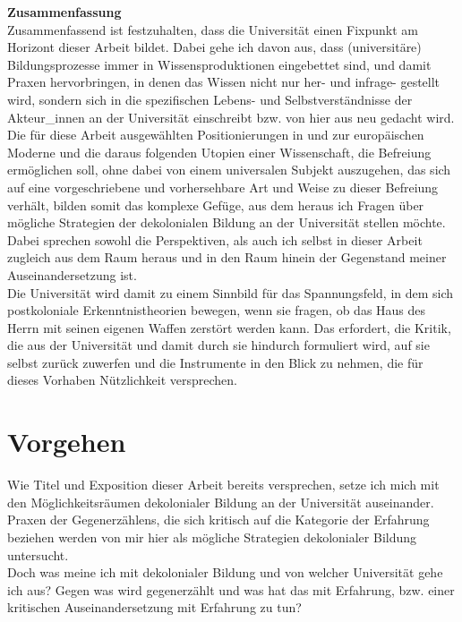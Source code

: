 \noindent\textbf{\large Zusammenfassung}\\
Zusammenfassend ist festzuhalten, dass die
Universität einen Fixpunkt am Horizont dieser Arbeit bildet. Dabei gehe ich
davon aus, dass (universitäre) Bildungsprozesse immer in Wissensproduktionen
eingebettet sind, und damit Praxen hervorbringen, in denen das Wissen nicht nur
her- und infrage- gestellt wird, sondern sich in die spezifischen Lebens- und
Selbstverständnisse der Akteur\_innen an der Universität einschreibt bzw. von
hier aus neu gedacht wird.\\
Die für diese Arbeit ausgewählten Positionierungen in und zur europäischen
Moderne und die daraus folgenden Utopien einer Wissenschaft, die Befreiung
ermöglichen soll, ohne dabei von einem universalen Subjekt auszugehen, das sich
auf eine vorgeschriebene und vorhersehbare Art und Weise zu dieser Befreiung
verhält, bilden somit das komplexe Gefüge, aus dem heraus ich Fragen über
mögliche Strategien der dekolonialen Bildung an der Universität stellen möchte.\\
Dabei sprechen sowohl die Perspektiven, als auch ich selbst in dieser Arbeit
zugleich aus dem Raum heraus und in den Raum hinein der Gegenstand meiner
Auseinandersetzung ist. \\
Die Universität wird damit zu einem Sinnbild für das
Spannungsfeld, in dem sich postkoloniale Erkenntnistheorien bewegen, wenn sie
fragen, ob das Haus des Herrn mit seinen eigenen Waffen zerstört werden
kann.\footnotemark {} Das erfordert, die Kritik, die aus der Universität und damit durch sie hindurch formuliert wird, auf sie selbst zurück zuwerfen und die Instrumente in den Blick zu nehmen, die für dieses Vorhaben Nützlichkeit versprechen.
\newpage
\section{Vorgehen}

Wie Titel und Exposition dieser Arbeit bereits versprechen, setze ich mich mit
den Möglichkeitsräumen dekolonialer Bildung an der Universität auseinander.
Praxen der Gegenerzählens, die sich kritisch auf die Kategorie der Erfahrung
beziehen werden von mir hier als mögliche Strategien dekolonialer Bildung
untersucht.\\
Doch was meine ich mit dekolonialer Bildung und von welcher Universität gehe
ich aus? Gegen was wird gegenerzählt und was hat das mit Erfahrung, bzw. einer
kritischen Auseinandersetzung mit Erfahrung zu tun?\\


